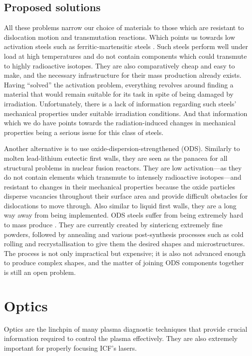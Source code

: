 \documentclass[12pt, a4paper]{article}
\newcommand{\ic}{ICF}
\begin{document}
		\subsection{Proposed solutions}
			All these problems narrow our choice of materials to those which are resistant to dislocation motion and transmutation reactions. Which points us towards low activation steels such as ferritic-martensitic steels \cite{fms1}. Such steels perform well under load at high temperatures and do not contain components which could transmute to highly radioactive isotopes. They are also comparatively cheap and easy to make, and the necessary infrastructure for their mass production already exists. Having ``solved'' the activation problem, everything revolves around finding a material that would remain suitable for its task in spite of being damaged by irradiation. Unfortunately, there is a lack of information regarding such steels' mechanical properties under suitable irradiation conditions. And that information which we do have \cite{fms1, fms2, fms3, fms4} points towards the radiation-induced changes in mechanical properties being a serious issue for this class of steels.

			Another alternative is to use oxide-dispersion-strengthened (ODS). Similarly to molten lead-lithium eutectic first walls, they are seen as the panacea for all structural problems in nuclear fusion reactors. They are low activation---as they do not contain elements which transmute to intensely radioactive isotopes---and resistant to changes in their mechanical properties because the oxide particles disperse vacancies throughout their surface area and provide difficult obstacles for dislocations to move through. Also similar to liquid first walls, they are a long way away from being implemented. ODS steels suffer from being extremely hard to mass produce \cite{ods1}. They are currently created by sintericng extremely fine powders, followed by annealing and various post-synthesis processes such as cold rolling and recrystallisation to give them the desired shapes and microstructures. The process is not only impractical but expensive; it is also not advanced enough to produce complex shapes, and the matter of joining ODS components together is still an open problem.
	\section{Optics}
		Optics are the linchpin of many plasma diagnostic techniques that provide crucial information required to control the plasma effectively. They are also extremely important for properly focusing \ic's lasers. 
		
\end{document}
